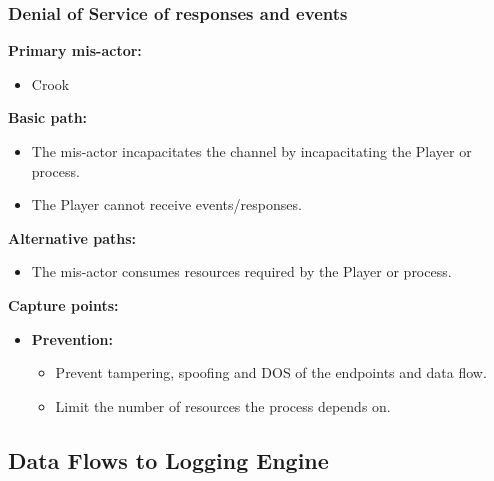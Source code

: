 \documentclass[a4paper,11pt]{report}
\begin{document}
\subsubsection{Denial of Service of responses and events}
\label{PlayerFlowCasesD4}
\textbf{Primary mis-actor:}
\begin{itemize}
\item Crook
\end{itemize}
\textbf{Basic path:}
\begin{itemize}
\item The mis-actor incapacitates the channel by incapacitating the Player or process.
\item The Player cannot receive events/responses.
\end{itemize}
\textbf{Alternative paths:}
\begin{itemize}
\item The mis-actor consumes resources required by the Player or process.
\end{itemize}
\textbf{Capture points:}
\begin{itemize}
\item \textbf{Prevention:}
\begin{itemize}
\item Prevent tampering, spoofing and DOS of the endpoints and data flow.
\item Limit the number of resources the process depends on.
\end{itemize}
\end{itemize}

\subsection{Data Flows to Logging Engine}
\label{LoggingEngineFlowCases}
\end{document}
